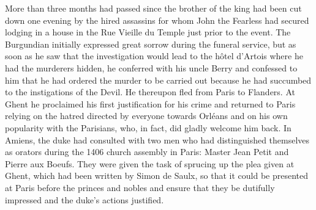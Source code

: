More than three months had passed since the brother of the king had been
cut down one evening by the hired assassins for whom
\protect\hypertarget{18_Chapter_Eleven__THE_FORMS_OF_THO.xhtmlux5cux23page_271}{}{}John
the Fearless had secured lodging in a house in the Rue Vieille du Temple
just prior to the event. The Burgundian initially expressed great sorrow
during the funeral service, but as soon as he saw that the investigation
would lead to the hôtel d'Artois where he had the murderers hidden, he
conferred with his uncle Berry and confessed to him that he had ordered
the murder to be carried out because he had succumbed to the
instigations of the Devil. He thereupon fled from Paris to Flanders. At
Ghent he proclaimed his first justification for his crime and returned
to Paris relying on the hatred directed by everyone towards Orléans and
on his own popularity with the Parisians, who, in fact, did gladly
welcome him back. In Amiens, the duke had consulted with two men who had
distinguished themselves as orators during the 1406 church assembly in
Paris: Master Jean Petit and Pierre aux Boeufs. They were given the task
of sprucing up the plea given at Ghent, which had been written by Simon
de Saulx, so that it could be presented at Paris before the princes and
nobles and ensure that they be dutifully impressed and the duke's
actions justified.

